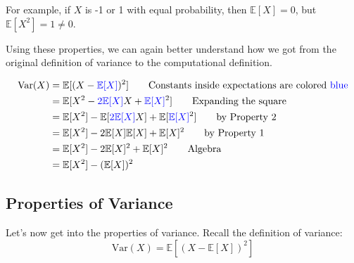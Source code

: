 \documentclass[
  letterpaper,
  DIV=11,
  numbers=noendperiod]{scrreprt}
\begin{document}
For example, if \(X\) is -1 or 1 with equal probability, then
\(\mathbb{E}[X] = 0\), but \(\mathbb{E}[X^2] = 1 \neq 0\).

Using these properties, we can again better understand how we got from
the original definition of variance to the computational definition.

\begin{tcolorbox}[enhanced jigsaw, titlerule=0mm, bottomtitle=1mm, arc=.35mm, colframe=quarto-callout-tip-color-frame, rightrule=.15mm, opacityback=0, opacitybacktitle=0.6, leftrule=.75mm, breakable, toprule=.15mm, colback=white, left=2mm, colbacktitle=quarto-callout-tip-color!10!white, toptitle=1mm, bottomrule=.15mm, title=\textcolor{quarto-callout-tip-color}{\faLightbulb}\hspace{0.5em}{Proof}, coltitle=black]

\begin{align}
   \text{Var}(X) &= \mathbb{E}[(X-\textcolor{blue}{\mathbb{E}[X]})^2] \hspace{2em} \text{Constants inside expectations are colored \textcolor{blue}{blue}} \\
   &= \mathbb{E}[X^2 - \textcolor{blue}{2\mathbb{E}[X]}X + \textcolor{blue}{\mathbb{E}[X]}^2] \hspace{2em} \text{Expanding the square}\\
   &= \mathbb{E}[X^2] - \mathbb{E}[\textcolor{blue}{2\mathbb{E}[X]}X] +\mathbb{E}[\textcolor{blue}{\mathbb{E}[X]}^2] \hspace{2em} \text{by Property 2}\\
   &= \mathbb{E}[X^2] - 2 \mathbb{E}[X]\mathbb{E}[X] +\mathbb{E}[X]^2 \hspace{2em} \text{by Property 1}\\
   &= \mathbb{E}[X^2] - 2 \mathbb{E}[X]^2 +\mathbb{E}[X]^2 \hspace{2em} \text{Algebra}\\
   &= \mathbb{E}[X^2] - (\mathbb{E}[X])^2
\end{align}

\end{tcolorbox}

\subsection{Properties of Variance}\label{properties-of-variance}

Let's now get into the properties of variance. Recall the definition of
variance: \[\text{Var}(X) = \mathbb{E}[(X-\mathbb{E}[X])^2]\]
\end{document}
